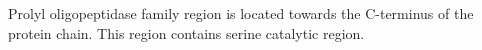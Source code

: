 Prolyl oligopeptidase family region is located towards the C-terminus of the protein chain. This region contains serine catalytic region.  